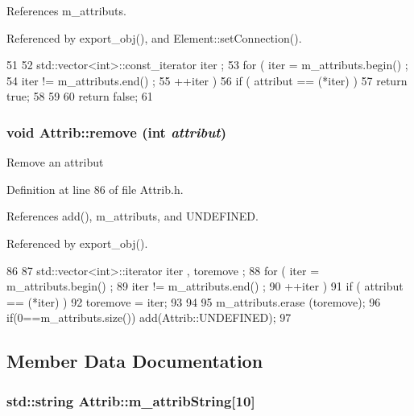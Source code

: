 References m\_\-attributs.

Referenced by export\_\-obj(), and Element::setConnection().


\begin{DoxyCode}
51   {
52     std::vector<int>::const_iterator iter ;
53     for ( iter  = m_attributs.begin() ;
54           iter != m_attributs.end()   ;
55           ++iter ) {
56       if ( attribut == (*iter) ) {
57         return true;
58       }
59     }
60     return false;
61   }
\end{DoxyCode}
\hypertarget{classAttrib_a7d4ef7e32d93cb287792b87b857e79f3}{
\subsubsection[{remove}]{\setlength{\rightskip}{0pt plus 5cm}void Attrib::remove (int {\em attribut})}}
\label{classAttrib_a7d4ef7e32d93cb287792b87b857e79f3}
Remove an attribut 

Definition at line 86 of file Attrib.h.

References add(), m\_\-attributs, and UNDEFINED.

Referenced by export\_\-obj().


\begin{DoxyCode}
86                                {
87     std::vector<int>::iterator iter , toremove ;
88     for ( iter  = m_attributs.begin() ;
89           iter != m_attributs.end()   ;
90           ++iter ) {
91       if ( attribut == (*iter) ) {
92         toremove = iter;
93       }
94     }
95     m_attributs.erase (toremove);
96     if(0==m_attributs.size()) add(Attrib::UNDEFINED);
97   }
\end{DoxyCode}


\subsection{Member Data Documentation}
\hypertarget{classAttrib_a3414521d7a82476e874b25a5407b5e63}{
\subsubsection[{m\_\-attribString}]{\setlength{\rightskip}{0pt plus 5cm}std::string {\bf Attrib::m\_\-attribString}\mbox{[}10\mbox{]}}}
\label{classAttrib_a3414521d7a82476e874b25a5407b5e63}



